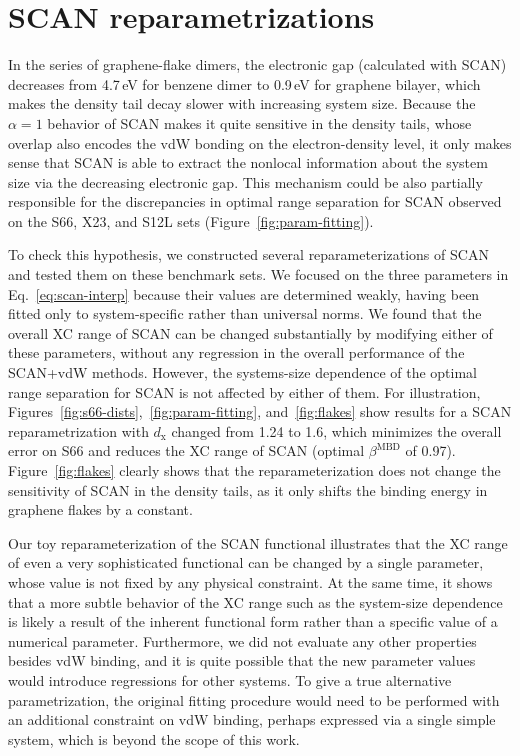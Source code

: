 \section{SCAN reparametrizations}

In the series of graphene-flake dimers, the electronic gap (calculated with SCAN) decreases from 4.7\,eV for benzene dimer to 0.9\,eV for graphene bilayer, which makes the density tail decay slower with increasing system size.
Because the $\alpha=1$ behavior of SCAN makes it quite sensitive in the density tails, whose overlap also encodes the vdW bonding on the electron-density level, it only makes sense that SCAN is able to extract the nonlocal information about the system size via the decreasing electronic gap.
This mechanism could be also partially responsible for the discrepancies in optimal range separation for SCAN observed on the S66, X23, and S12L sets (Figure~\ref{fig:param-fitting}).

To check this hypothesis, we constructed several reparameterizations of SCAN and tested them on these benchmark sets.
We focused on the three parameters in Eq.~\ref{eq:scan-interp} because their values are determined weakly, having been fitted only to system-specific rather than universal norms.
We found that the overall XC range of SCAN can be changed substantially by modifying either of these parameters, without any regression in the overall performance of the SCAN+vdW methods.
However, the systems-size dependence of the optimal range separation for SCAN is not affected by either of them.
For illustration, Figures~\ref{fig:s66-dists},~\ref{fig:param-fitting}, and~\ref{fig:flakes} show results for a SCAN reparametrization with $d_\mathrm x$ changed from 1.24 to 1.6, which minimizes the overall error on S66 and reduces the XC range of SCAN (optimal $\beta^\text{MBD}$ of 0.97).
Figure~\ref{fig:flakes} clearly shows that the reparameterization does not change the sensitivity of SCAN in the density tails, as it only shifts the binding energy in graphene flakes by a constant.

Our toy reparameterization of the SCAN functional illustrates that the XC range of even a very sophisticated functional can be changed by a single parameter, whose value is not fixed by any physical constraint.
At the same time, it shows that a more subtle behavior of the XC range such as the system-size dependence is likely a result of the inherent functional form rather than a specific value of a numerical parameter.
Furthermore, we did not evaluate any other properties besides vdW binding, and it is quite possible that the new parameter values would introduce regressions for other systems.
To give a true alternative parametrization, the original fitting procedure would need to be performed with an additional constraint on vdW binding, perhaps expressed via a single simple system, which is beyond the scope of this work.
